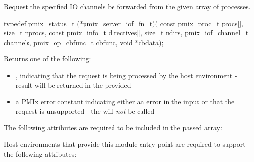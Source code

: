 \summary

Request the specified IO channels be forwarded from the given array of processes.

\format

\cspecificstart
\begin{codepar}
typedef pmix_status_t (*pmix_server_iof_fn_t)(
                        const pmix_proc_t procs[], size_t nprocs,
                        const pmix_info_t directives[], size_t ndirs,
                        pmix_iof_channel_t channels,
                        pmix_op_cbfunc_t cbfunc, void *cbdata);
\end{codepar}
\cspecificend

\begin{arglist}
\end{arglist}

Returns one of the following:

\begin{itemize}
    \item {}, indicating that the request is being processed by the host environment - result will be returned in the provided 
    \item a PMIx error constant indicating either an error in the input or that the request is unsupported - the  will \textit{not} be called
\end{itemize}

\reqattrstart
The following attributes are required to be included in the passed  array:


Host environments that provide this module entry point are required to support the following attributes:


